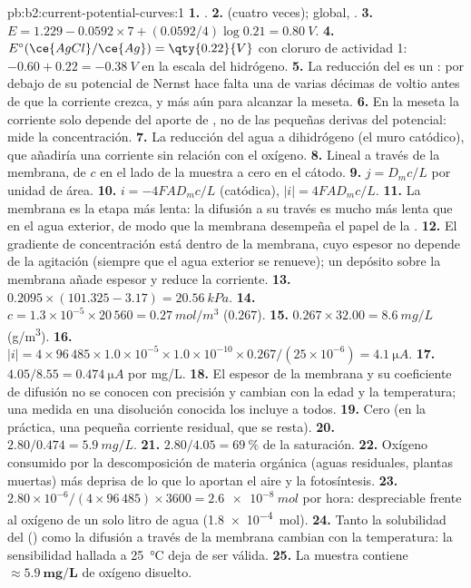 \begin{solution}{pb:b2:current-potential-curves:1}
\textbf{1.} .
\textbf{2.}  (cuatro veces); global, .
\textbf{3.} $E = 1.229 - 0.0592 \times 7 + (0.0592/4)\log 0.21 = \qty{0.80}{V}$.
\textbf{4.} $E^\circ(\ce{AgCl}/\ce{Ag}) = \qty{0.22}{V}$ con cloruro de actividad 1:
$-0.60 + 0.22 = \qty{-0.38}{V}$ en la escala del hidrógeno.
\textbf{5.} La reducción del  es un : por debajo de su potencial de Nernst
hace falta una  de varias décimas de voltio antes de que la corriente
crezca, y más aún para alcanzar la meseta.
\textbf{6.} En la meseta la corriente solo depende del aporte de ,
no de las pequeñas derivas del potencial: mide la concentración.
\textbf{7.} La reducción del agua a dihidrógeno (el muro catódico), que
añadiría una corriente sin relación con el oxígeno.
\textbf{8.} Lineal a través de la membrana, de $c$ en el lado de la muestra a cero en
el cátodo.
\textbf{9.} $j = D_m c/L$ por unidad de área.
\textbf{10.} $i = -4FAD_m c/L$ (catódica), $|i| = 4FAD_mc/L$.
\textbf{11.} La membrana es la etapa más lenta: la difusión a su través es mucho
más lenta que en el agua exterior, de modo que la membrana desempeña el papel de la
.
\textbf{12.} El gradiente de concentración está dentro de la membrana, cuyo espesor
no depende de la agitación (siempre que el agua exterior se renueve);
un depósito sobre la membrana añade espesor y reduce la corriente.
\textbf{13.} $0.2095 \times (101.325 - 3.17) = \qty{20.56}{kPa}$.
\textbf{14.} $c = 1.3 \times 10^{-5} \times 20\,560 = \qty{0.27}{mol/m^3}$ ($0.267$).
\textbf{15.} $0.267 \times 32.00 = \qty{8.6}{mg/L}$ (\unit{g/m^3}).
\textbf{16.} $|i| = 4 \times 96\,485 \times 1.0 \times 10^{-5} \times 1.0 \times 10^{-10}
\times 0.267/(25 \times 10^{-6}) = \qty{4.1}{\micro A}$.
\textbf{17.} $4.05/8.55 = \qty{0.474}{\micro A}$ por \unit{mg/L}.
\textbf{18.} El espesor de la membrana y su coeficiente de difusión no se conocen
con precisión y cambian con la edad y la temperatura; una medida en una disolución
conocida los incluye a todos.
\textbf{19.} Cero (en la práctica, una pequeña corriente residual, que se resta).
\textbf{20.} $2.80/0.474 = \qty{5.9}{mg/L}$.
\textbf{21.} $2.80/4.05 = 69~\%$ de la saturación.
\textbf{22.} Oxígeno consumido por la descomposición de materia orgánica (aguas residuales, plantas muertas)
más deprisa de lo que lo aportan el aire y la fotosíntesis.
\textbf{23.} $2.80 \times 10^{-6}/(4 \times 96\,485) \times 3600 = \qty{2.6e-8}{mol}$
por hora: despreciable frente al oxígeno de un solo litro de agua
(\qty{1.8e-4}{mol}).
\textbf{24.} Tanto la solubilidad del  () como la difusión
a través de la membrana cambian con la temperatura: la sensibilidad hallada a
\qty{25}{\degreeCelsius} deja de ser válida.
\textbf{25.} La muestra contiene $\boldsymbol{\approx \qty{5.9}{mg/L}}$ de oxígeno
disuelto.
\end{solution}

